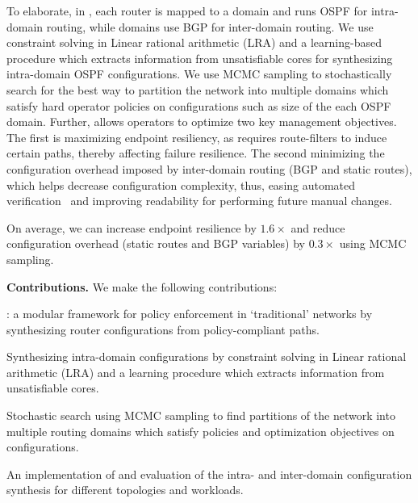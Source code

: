 To elaborate, in \name, each router is mapped to a domain and runs
OSPF for intra- domain routing, while domains use BGP for inter-domain
routing. We use constraint solving in Linear rational arithmetic (LRA)
and a learning-based procedure which extracts information from
unsatisfiable cores for synthesizing intra-domain OSPF configurations.
We use MCMC sampling to stochastically search for the best way to
partition the network into multiple domains which satisfy hard
operator policies on configurations such as size of the each OSPF
domain. Further, \name allows operators to optimize two key management
objectives. The first is maximizing endpoint resiliency, as \name
requires route-filters to induce certain paths, thereby affecting
failure resilience. The second minimizing the configuration overhead imposed
by inter-domain routing (BGP and static routes), which helps decrease
configuration complexity, thus, easing automated
verification~\cite{batfish, arc, era} and improving readability for
performing future manual changes.

  On average, we can increase
endpoint resilience by $1.6\times$ and reduce configuration overhead
(static routes and BGP variables) by $0.3\times$ using MCMC sampling.



\noindent\textbf{Contributions.} We make the following contributions:
\begin{compactitemize}
	\item \name: a modular framework 
	for policy enforcement in `traditional' networks
	by synthesizing router configurations from policy-compliant paths. 
	\item Synthesizing intra-domain configurations by
	constraint solving in Linear rational arithmetic (LRA) and 
	a learning procedure which extracts information from 
	unsatisfiable cores. 
	\item Stochastic search using MCMC sampling to find 
	partitions of the network into multiple routing domains which
	satisfy policies and optimization objectives on configurations.
	\item An implementation of \name and evaluation of the 
	intra- and inter-domain configuration synthesis for different
	topologies and workloads. 
\end{compactitemize}

